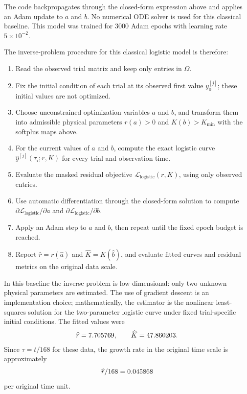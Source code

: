 The code backpropagates through the closed-form expression above and applies an
Adam update \citep{kingma2015adam} to $a$ and $b$. No numerical ODE solver is
used for this classical baseline. This model was trained for 3000 Adam epochs
with learning rate $5\times10^{-2}$.

The inverse-problem procedure for this classical logistic model is therefore:

\begin{enumerate}
  \item Read the observed trial matrix and keep only entries in $\Omega$.
  \item Fix the initial condition of each trial at its observed first value
        $y_0^{[j]}$; these initial values are not optimized.
  \item Choose unconstrained optimization variables $a$ and $b$, and transform
        them into admissible physical parameters $r(a)>0$ and $K(b)>K_{\min}$
        with the softplus maps above.
  \item For the current values of $a$ and $b$, compute the exact logistic curve
        $\widehat y^{[j]}(\tau_i;r,K)$ for every trial and observation time.
  \item Evaluate the masked residual objective
        $\mathcal L_{\mathrm{logistic}}(r,K)$, using only observed entries.
  \item Use automatic differentiation through the closed-form solution to
        compute $\partial \mathcal L_{\mathrm{logistic}}/\partial a$ and
        $\partial \mathcal L_{\mathrm{logistic}}/\partial b$.
  \item Apply an Adam step to $a$ and $b$, then repeat until the fixed epoch
        budget is reached.
  \item Report $\widehat r=r(\widehat a)$ and
        $\widehat K=K(\widehat b)$, and evaluate fitted curves and residual
        metrics on the original data scale.
\end{enumerate}

In this baseline the inverse problem is low-dimensional: only two unknown
physical parameters are estimated. The use of gradient descent is an
implementation choice; mathematically, the estimator is the nonlinear
least-squares solution for the two-parameter logistic curve under fixed
trial-specific initial conditions.
The fitted values were
$$
  \widehat r = 7.705769,
  \qquad
  \widehat K = 47.860203.
$$
Since $\tau=t/168$ for these data, the growth rate in the original time scale
is approximately
$$
    \widehat r/168=0.045868
$$
per original time unit.